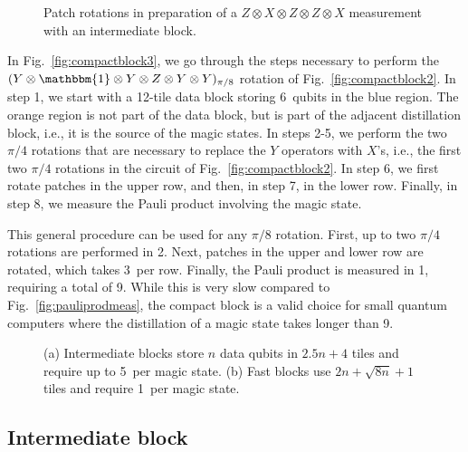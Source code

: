 \documentclass[prx,aps,letterpaper,twocolumn,allowfontchageintitle=true,accepted=2019-02-01]{quantumarticle}
\begin{document}
\begin{figure}[t!]
\centering
\def\svgwidth{\linewidth}

\caption{Patch rotations in preparation of a $Z \otimes X \otimes Z \otimes Z \otimes X$ measurement with an intermediate block.}
\label{fig:intermediateblockmove}
\end{figure}

In Fig.~\ref{fig:compactblock3}, we go through the steps necessary to perform the $(Y \otimes \mathbbm{1} \otimes Y \otimes Z \otimes Y \otimes Y)_{\pi/8}$ rotation of Fig.~\ref{fig:compactblock2}. In step 1, we start with a 12-tile data block storing 6~qubits in the blue region. The orange region is not part of the data block, but is part of the adjacent distillation block, i.e., it is the source of the magic states. In steps 2-5, we perform the two $\pi/4$ rotations that are necessary to replace the $Y$ operators with $X$'s, i.e., the first two $\pi/4$ rotations in the circuit of Fig.~\ref{fig:compactblock2}. In step 6, we first rotate patches in the upper row, and then, in step 7, in the lower row. Finally, in step 8, we measure the Pauli product involving the magic state.

This general procedure can be used for any $\pi/8$ rotation. First, up to two $\pi/4$ rotations are performed in 2\clock. Next, patches in the upper and lower row are rotated, which takes 3\clock \ per row. Finally, the Pauli product is measured in 1\clock, requiring a total of 9\clock. While this is very slow compared to Fig.~\ref{fig:pauliprodmeas}, the compact block is a valid choice for small quantum computers where the distillation of a magic state takes longer than 9\clock.




\begin{figure}[b!]
\centering
\def\svgwidth{0.84\linewidth}

\caption{(a) Intermediate blocks store $n$ data qubits in $2.5n+4$ tiles and require up to 5\clock \ per magic state. (b) Fast blocks  use $2n+\sqrt{8n}+1$ tiles and require 1\clock \ per magic state.}
\label{fig:fasterblocks}
\end{figure}




\subsection{Intermediate block}
\end{document}
